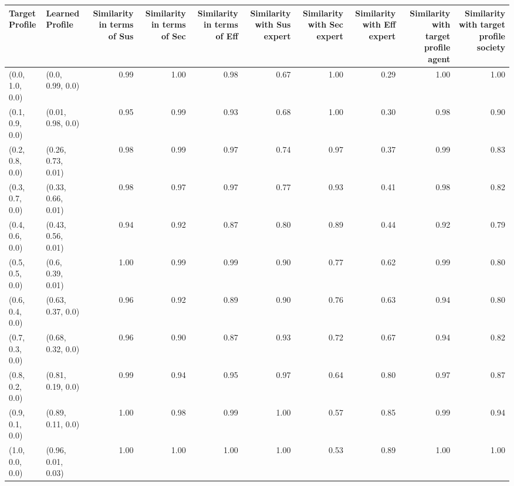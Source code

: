 \begin{tabular}{llrrrrrrrr}
\toprule
Target Profile & Learned Profile & Similarity in terms of Sus & Similarity in terms of Sec & Similarity in terms of Eff & Similarity with Sus expert & Similarity with Sec expert & Similarity with Eff expert & Similarity with target profile agent & Similarity with target profile society \\
\midrule
(0.0, 1.0, 0.0) & (0.0, 0.99, 0.0) & 0.99 & 1.00 & 0.98 & 0.67 & 1.00 & 0.29 & 1.00 & 1.00 \\
(0.1, 0.9, 0.0) & (0.01, 0.98, 0.0) & 0.95 & 0.99 & 0.93 & 0.68 & 1.00 & 0.30 & 0.98 & 0.90 \\
(0.2, 0.8, 0.0) & (0.26, 0.73, 0.01) & 0.98 & 0.99 & 0.97 & 0.74 & 0.97 & 0.37 & 0.99 & 0.83 \\
(0.3, 0.7, 0.0) & (0.33, 0.66, 0.01) & 0.98 & 0.97 & 0.97 & 0.77 & 0.93 & 0.41 & 0.98 & 0.82 \\
(0.4, 0.6, 0.0) & (0.43, 0.56, 0.01) & 0.94 & 0.92 & 0.87 & 0.80 & 0.89 & 0.44 & 0.92 & 0.79 \\
(0.5, 0.5, 0.0) & (0.6, 0.39, 0.01) & 1.00 & 0.99 & 0.99 & 0.90 & 0.77 & 0.62 & 0.99 & 0.80 \\
(0.6, 0.4, 0.0) & (0.63, 0.37, 0.0) & 0.96 & 0.92 & 0.89 & 0.90 & 0.76 & 0.63 & 0.94 & 0.80 \\
(0.7, 0.3, 0.0) & (0.68, 0.32, 0.0) & 0.96 & 0.90 & 0.87 & 0.93 & 0.72 & 0.67 & 0.94 & 0.82 \\
(0.8, 0.2, 0.0) & (0.81, 0.19, 0.0) & 0.99 & 0.94 & 0.95 & 0.97 & 0.64 & 0.80 & 0.97 & 0.87 \\
(0.9, 0.1, 0.0) & (0.89, 0.11, 0.0) & 1.00 & 0.98 & 0.99 & 1.00 & 0.57 & 0.85 & 0.99 & 0.94 \\
(1.0, 0.0, 0.0) & (0.96, 0.01, 0.03) & 1.00 & 1.00 & 1.00 & 1.00 & 0.53 & 0.89 & 1.00 & 1.00 \\
\bottomrule
\end{tabular}
